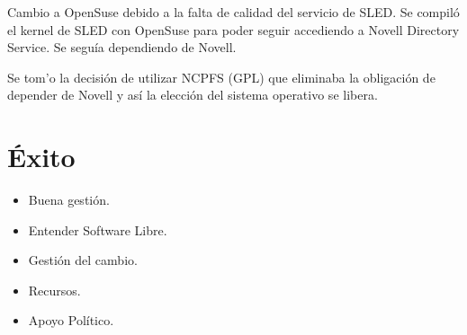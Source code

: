 \documentclass[11pt]{scrartcl}
\begin{document}
\par Cambio a OpenSuse debido a la falta de calidad del servicio de SLED. Se compil\'o el kernel de SLED con OpenSuse para poder seguir accediendo a Novell Directory Service. Se segu\'ia dependiendo de Novell.

\par Se tom'o la decisi\'on de utilizar NCPFS (GPL) que eliminaba la obligaci\'on de depender de Novell y as\'i la elecci\'on del sistema operativo se libera.


\section{\'Exito}
\label{sec:exito}

\begin{itemize}
	\item Buena gesti\'on.
	\item Entender Software Libre.
	\item Gesti\'on del cambio.
	\item Recursos.
	\item Apoyo Pol\'itico.
\end{itemize}

\end{document}
